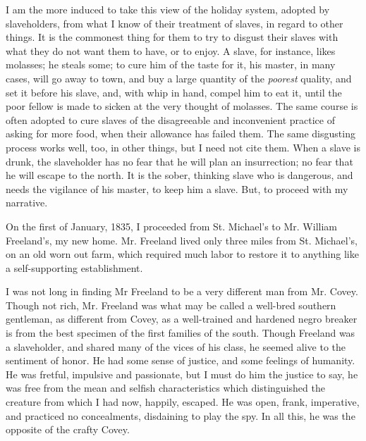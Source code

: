 I am the more induced to take this view of the holiday system, adopted
by slaveholders, from what I know of their treatment of slaves, in
regard to other things. It is the commonest thing for them to try to
disgust their slaves with what they do not want them to have, or to
enjoy. A slave, for instance, likes molasses; he steals some; to cure
him of the taste for it, his master, in many cases, will go away to
town, and buy a large quantity of the \emph{poorest} quality, and set it
before his slave, and, with whip in hand, compel him to eat it, until
the poor fellow is made to sicken at the very thought of molasses. The
same course is often adopted to cure slaves of the disagreeable and
inconvenient practice of asking for more food, when their allowance has
failed them. The same disgusting process works well, too, in other
things, but I need not cite them. When a slave is drunk, the slaveholder
has no fear that he will plan an insurrection; no fear that he will
escape to the north. It is the sober, thinking slave who is dangerous,
and needs the vigilance of his master, to keep him a slave. But, to
proceed with my narrative.

On the first of January, 1835, I proceeded from St. Michael's to Mr.
William Freeland's, my new home. Mr. Freeland lived only three miles
from St. Michael's, on an old worn out farm, which required much labor
{}to restore it to anything like a self-supporting establishment.

I was not long in finding Mr Freeland to be a very different man from
Mr. Covey. Though not rich, Mr. Freeland was what may be called a
well-bred southern gentleman, as different from Covey, as a well-trained
and hardened negro breaker is from the best specimen of the first
families of the south. Though Freeland was a slaveholder, and shared
many of the vices of his class, he seemed alive to the sentiment of
honor. He had some sense of justice, and some feelings of humanity. He
was fretful, impulsive and passionate, but I must do him the justice to
say, he was free from the mean and selfish characteristics which
distinguished the creature from which I had now, happily, escaped. He
was open, frank, imperative, and practiced no concealments, disdaining
to play the spy. In all this, he was the opposite of the crafty Covey.

